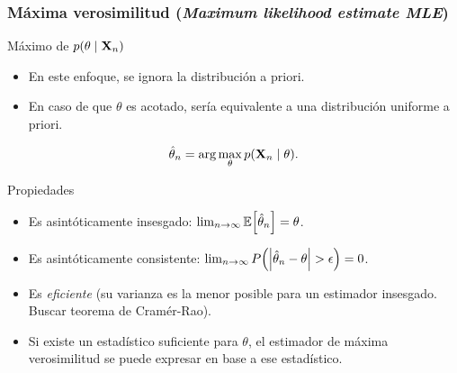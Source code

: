 \documentclass[table]{beamer}
\begin{document}
\begin{frame}
    \frametitle{Máxima verosimilitud (\emph{Maximum likelihood estimate MLE})}
    \begin{block}{Máximo de $\pdf{\theta \mid \Xvec_{n}}$}
        \begin{itemize}
            \item En este enfoque, se ignora la distribución a priori.
            \item En caso de que $\theta$ es acotado, sería equivalente a una distribución uniforme a priori.
        \end{itemize}
        \begin{equation*}
            \hat{\theta}_{n}
            = \arg \max_{\theta} \pdf{\Xvec_{n} \mid \theta} .
        \end{equation*}
    \end{block}
    \begin{block}{Propiedades}
        \begin{itemize}
            \item Es asintóticamente insesgado: $\lim_{n \to \infty} \expected{\hat{\theta}_{n}} = \theta$.
            \item Es asintóticamente consistente: $\lim_{n \to \infty} \prob{\vparens{\hat{\theta}_{n} - \theta} > \epsilon} = 0$.
            \item Es \emph{eficiente} (su varianza es la menor posible para un estimador insesgado. Buscar teorema de Cramér-Rao).
            \item Si existe un estadístico suficiente para $\theta$, el estimador de máxima verosimilitud se puede expresar en base a ese estadístico.
        \end{itemize}
    \end{block}
\end{frame}
\end{document}
